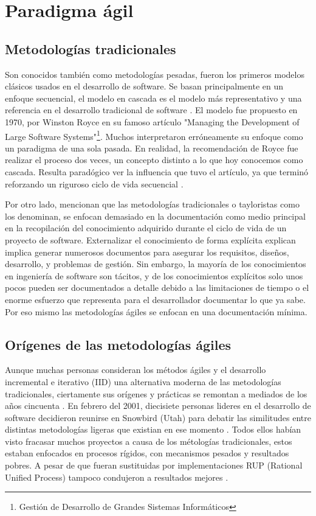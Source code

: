 \section{Paradigma ágil}

  \subsection{Metodologías tradicionales}

  Son conocidos también como metodologías pesadas, fueron los primeros modelos clásicos usados en el desarrollo de software. Se basan principalmente en un enfoque secuencial, el modelo en cascada es el modelo más representativo y una referencia en el desarrollo tradicional de software \cite{islam:2020}. El modelo fue propuesto en 1970, por Winston Royce en su famoso artículo "Managing the Development of Large Software Systems"\footnote{Gestión de Desarrollo de Grandes Sistemas Informáticos}. Muchos interpretaron erróneamente su enfoque como un paradigma de una sola pasada. En realidad, la recomendación de Royce fue realizar el proceso dos veces, un concepto distinto a lo que hoy conocemos como cascada. Resulta paradógico ver la influencia que tuvo el artículo, ya que terminó reforzando un riguroso ciclo de vida secuencial \cite{larman:2003}.

  Por otro lado,  mencionan que las metodologías tradicionales o tayloristas como los denominan, se enfocan demasiado en la documentación como medio principal en la recopilación del conocimiento adquirido durante el ciclo de vida de un proyecto de software. Externalizar el conocimiento de forma explícita explican implica generar numerosos documentos para asegurar los requisitos, diseños, desarrollo, y problemas de gestión. Sin embargo, la mayoría de los conocimientos en ingeniería de software son tácitos, y de los conocimientos explícitos solo unos pocos pueden ser documentados a detalle debido a las limitaciones de tiempo o el enorme esfuerzo que representa para el desarrollador documentar lo que ya sabe. Por eso mismo las metodologías ágiles se enfocan en una documentación mínima.

  \subsection{Orígenes de las metodologías ágiles}
  Aunque muchas personas consideran los métodos ágiles y el desarrollo incremental e iterativo (IID) una alternativa moderna de las metodologías tradicionales, ciertamente sus orígenes y prácticas se remontan a mediados de los años cincuenta \cite{larman:2003}. En febrero del 2001, diecisiete personas lideres en el desarrollo de software decidieron reunirse en Snowbird (Utah) para debatir las similitudes entre distintas metodologías ligeras que existian en ese momento \cite{cockburn:2002}. Todos ellos habían visto fracasar muchos proyectos a causa de los métologías tradicionales, estos estaban enfocados en procesos rígidos, con mecanismos pesados y resultados pobres. A pesar de que fueran sustituidas por implementaciones RUP (Rational Unified Process) tampoco condujeron a resultados mejores \cite{verheyen:2019}.

